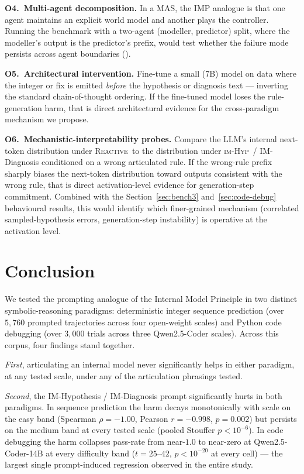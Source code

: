 \documentclass[11pt]{article}
\newcommand{\imhyp}{\textsc{im-Hyp}}
\newcommand{\reactive}{\textsc{Reactive}}
\begin{document}
\textbf{O4.\ Multi-agent decomposition.}  In a MAS, the IMP
analogue is that one agent maintains an explicit world model
and another plays the controller.  Running the benchmark with a
two-agent (modeller, predictor) split, where the modeller's
output is the predictor's prefix, would test whether the failure
mode persists across agent boundaries (\citealp{cemri2025why}).

\textbf{O5.\ Architectural intervention.}  Fine-tune a small
($7$B) model on data where the integer or fix is emitted
\emph{before} the hypothesis or diagnosis text --- inverting the
standard chain-of-thought ordering.  If the fine-tuned model
loses the rule-generation harm, that is direct architectural
evidence for the cross-paradigm mechanism we propose.

\textbf{O6.\ Mechanistic-interpretability probes.}  Compare the
LLM's internal next-token distribution under \reactive\ to the
distribution under \imhyp\ / IM-Diagnosis conditioned on a
wrong articulated rule.  If the wrong-rule prefix sharply biases
the next-token distribution toward outputs consistent with the
wrong rule, that is direct activation-level evidence for
generation-step commitment.  Combined with the
Section~\ref{sec:bench3} and~\ref{sec:code-debug} behavioural
results, this would identify which finer-grained mechanism
(correlated sampled-hypothesis errors, generation-step
instability) is operative at the activation level.

\section{Conclusion}
\label{sec:conclusion}

We tested the prompting analogue of the Internal Model Principle
in two distinct symbolic-reasoning paradigms: deterministic
integer sequence prediction (over $5{,}760$ prompted trajectories
across four open-weight scales) and Python code debugging (over
$3{,}000$ trials across three Qwen2.5-Coder scales).  Across this
corpus, four findings stand together.

\emph{First}, articulating an internal model never significantly
helps in either paradigm, at any tested scale, under any of the
articulation phrasings tested.

\emph{Second}, the IM-Hypothesis / IM-Diagnosis prompt
significantly hurts in both paradigms.  In sequence prediction
the harm decays monotonically with scale on the easy band
(Spearman $\rho = -1.00$, Pearson $r = -0.998$, $p = 0.002$) but
persists on the medium band at every tested scale (pooled
Stouffer $p < 10^{-6}$).  In code debugging the harm collapses
pass-rate from near-$1.0$ to near-zero at Qwen2.5-Coder-14B at
every difficulty band ($t = 25$--$42$, $p < 10^{-20}$ at every
cell) --- the largest single prompt-induced regression observed
in the entire study.
\end{document}
